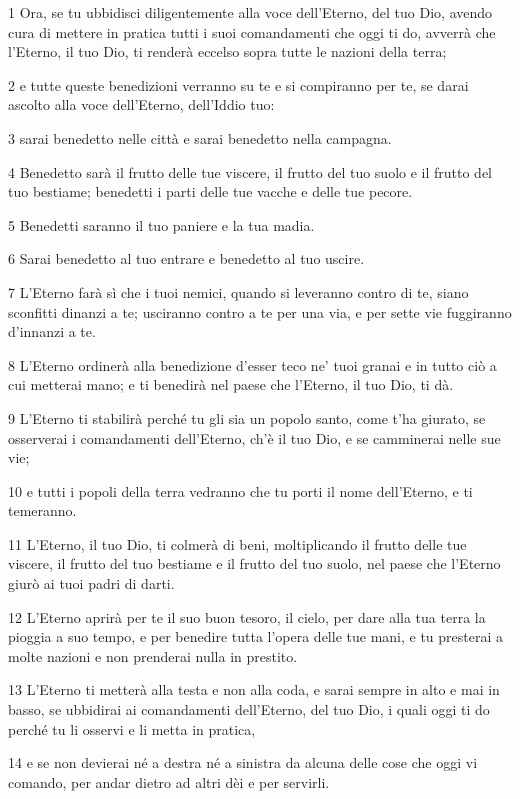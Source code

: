 \par 1 Ora, se tu ubbidisci diligentemente alla voce dell'Eterno, del tuo Dio, avendo cura di mettere in pratica tutti i suoi comandamenti che oggi ti do, avverrà che l'Eterno, il tuo Dio, ti renderà eccelso sopra tutte le nazioni della terra;
\par 2 e tutte queste benedizioni verranno su te e si compiranno per te, se darai ascolto alla voce dell'Eterno, dell'Iddio tuo:
\par 3 sarai benedetto nelle città e sarai benedetto nella campagna.
\par 4 Benedetto sarà il frutto delle tue viscere, il frutto del tuo suolo e il frutto del tuo bestiame; benedetti i parti delle tue vacche e delle tue pecore.
\par 5 Benedetti saranno il tuo paniere e la tua madia.
\par 6 Sarai benedetto al tuo entrare e benedetto al tuo uscire.
\par 7 L'Eterno farà sì che i tuoi nemici, quando si leveranno contro di te, siano sconfitti dinanzi a te; usciranno contro a te per una via, e per sette vie fuggiranno d'innanzi a te.
\par 8 L'Eterno ordinerà alla benedizione d'esser teco ne' tuoi granai e in tutto ciò a cui metterai mano; e ti benedirà nel paese che l'Eterno, il tuo Dio, ti dà.
\par 9 L'Eterno ti stabilirà perché tu gli sia un popolo santo, come t'ha giurato, se osserverai i comandamenti dell'Eterno, ch'è il tuo Dio, e se camminerai nelle sue vie;
\par 10 e tutti i popoli della terra vedranno che tu porti il nome dell'Eterno, e ti temeranno.
\par 11 L'Eterno, il tuo Dio, ti colmerà di beni, moltiplicando il frutto delle tue viscere, il frutto del tuo bestiame e il frutto del tuo suolo, nel paese che l'Eterno giurò ai tuoi padri di darti.
\par 12 L'Eterno aprirà per te il suo buon tesoro, il cielo, per dare alla tua terra la pioggia a suo tempo, e per benedire tutta l'opera delle tue mani, e tu presterai a molte nazioni e non prenderai nulla in prestito.
\par 13 L'Eterno ti metterà alla testa e non alla coda, e sarai sempre in alto e mai in basso, se ubbidirai ai comandamenti dell'Eterno, del tuo Dio, i quali oggi ti do perché tu li osservi e li metta in pratica,
\par 14 e se non devierai né a destra né a sinistra da alcuna delle cose che oggi vi comando, per andar dietro ad altri dèi e per servirli.
